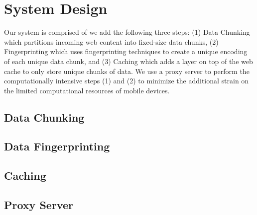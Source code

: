 \section{System Design}
\label{sec:sys_design}
Our system is comprised of we add 
the following three steps: (1) Data Chunking which partitions incoming web content into fixed-size data chunks, (2) Fingerprinting which uses fingerprinting 
techniques to create a unique encoding of each unique data chunk, and (3) Caching which adds a layer on top of the web cache to only store unique chunks of data. 
We use a proxy server to perform the computationally intensive steps (1) and (2) to minimize the additional strain on the limited computational resources of mobile 
devices.
\subsection{Data Chunking}
\subsection{Data Fingerprinting}
\subsection{Caching}
\subsection{Proxy Server}

